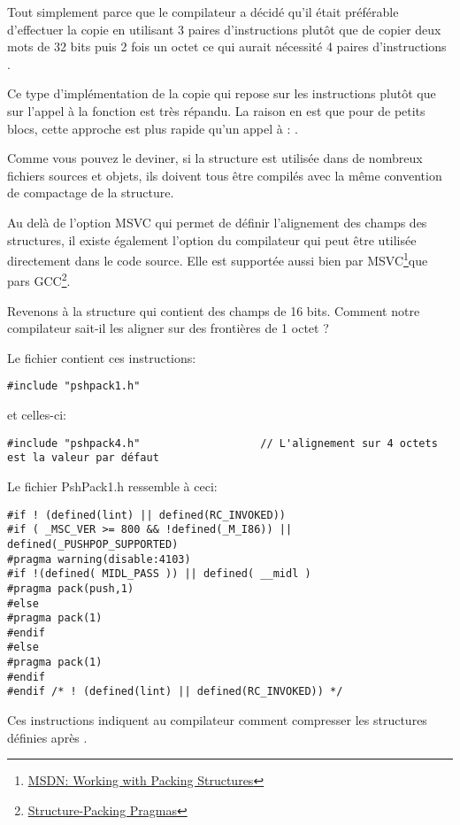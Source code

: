 Tout simplement parce que le compilateur a décidé qu'il était préférable d'effectuer la copie en utilisant 
3 paires d'instructions \MOV plutôt que de copier deux mots de 32 bits puis 2 fois un octet ce qui aurait 
nécessité 4 paires d'instructions \MOV.

Ce type d'implémentation de la copie qui repose sur les instructions \MOV plutôt que sur l'appel à la 
fonction  est très répandu. La raison en est que pour de petits blocs, cette approche est 
plus rapide qu'un appel à : .

Comme vous pouvez le deviner, si la structure est utilisée dans de nombreux fichiers sources et objets, ils 
doivent tous être compilés avec la même convention de compactage de la structure.

\newcommand{\FNURLMSDNZP}{\footnote{\href{http://go.yurichev.com/17067}
{MSDN: Working with Packing Structures}}}
\newcommand{\FNURLGCCPC}{\footnote{\href{http://go.yurichev.com/17068}
{Structure-Packing Pragmas}}}

Au delà de l'option MSVC  qui permet de définir l'alignement des champs des structures, il existe 
également l'option du compilateur  qui peut être utilisée directement dans le code source.
Elle est supportée aussi bien par MSVC\FNURLMSDNZP que pars GCC\FNURLGCCPC{}.

Revenons à la structure  qui contient des champs de 16 bits. Comment notre compilateur sait-il 
les aligner sur des frontières de 1 octet ?

Le fichier  contient ces instructions:

\begin{lstlisting}[caption=WinNT.h,style=customc]
#include "pshpack1.h"
\end{lstlisting}

et celles-ci:

\begin{lstlisting}[caption=WinNT.h,style=customc]
#include "pshpack4.h"                   // L'alignement sur 4 octets est la valeur par défaut
\end{lstlisting}

Le fichier PshPack1.h ressemble à ceci:

\begin{lstlisting}[caption=PshPack1.h,style=customc]
#if ! (defined(lint) || defined(RC_INVOKED))
#if ( _MSC_VER >= 800 && !defined(_M_I86)) || defined(_PUSHPOP_SUPPORTED)
#pragma warning(disable:4103)
#if !(defined( MIDL_PASS )) || defined( __midl )
#pragma pack(push,1)
#else
#pragma pack(1)
#endif
#else
#pragma pack(1)
#endif
#endif /* ! (defined(lint) || defined(RC_INVOKED)) */
\end{lstlisting}

Ces instructions indiquent au compilateur comment compresser les structures définies après .


